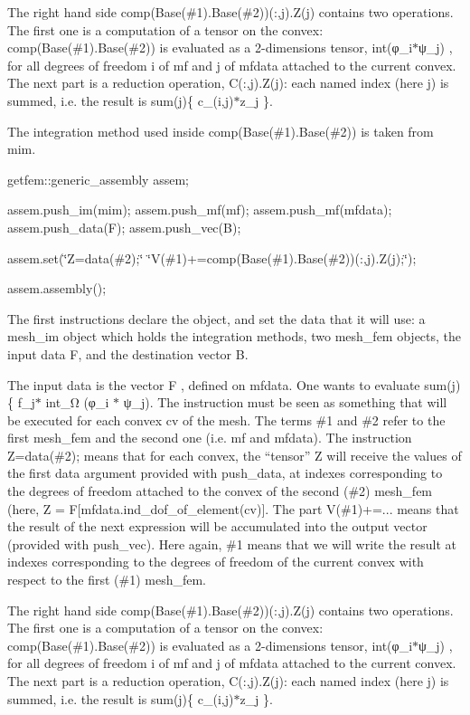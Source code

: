 The right hand side comp(Base(\#1).Base(\#2))(\-:,j).Z(j) contains two operations. The first one is a computation of a tensor on the convex\-: comp(Base(\#1).Base(\#2)) is evaluated as a 2-\/dimensions tensor, int(φ\-\_\-i$\ast$ψ\-\_\-j) , for all degrees of freedom i of mf and j of mfdata attached to the current convex. The next part is a reduction operation, C(\-:,j).Z(j)\-: each named index (here j) is summed, i.\-e. the result is sum(j)\{ c\-\_\-(i,j)$\ast$z\-\_\-j \}.

The integration method used inside comp(Base(\#1).Base(\#2)) is taken from mim.

getfem\-::generic\-\_\-assembly assem;

assem.\-push\-\_\-im(mim); assem.\-push\-\_\-mf(mf); assem.\-push\-\_\-mf(mfdata); assem.\-push\-\_\-data(\-F); assem.\-push\-\_\-vec(\-B);

assem.\-set(\char`\"{}\-Z=data(\#2);\char`\"{} \char`\"{}\-V(\#1)+=comp(\-Base(\#1).\-Base(\#2))(\-:,j).\-Z(j);\char`\"{});

assem.\-assembly();

The first instructions declare the object, and set the data that it will use\-: a mesh\-\_\-im object which holds the integration methods, two mesh\-\_\-fem objects, the input data F, and the destination vector B.

The input data is the vector F , defined on mfdata. One wants to evaluate sum(j)\{ f\-\_\-j$\ast$ int\-\_\-Ω (φ\-\_\-i $\ast$ ψ\-\_\-j). The instruction must be seen as something that will be executed for each convex cv of the mesh. The terms \#1 and \#2 refer to the first mesh\-\_\-fem and the second one (i.\-e. mf and mfdata). The instruction Z=data(\#2); means that for each convex, the “tensor” Z will receive the values of the first data argument provided with push\-\_\-data, at indexes corresponding to the degrees of freedom attached to the convex of the second (\#2) mesh\-\_\-fem (here, Z = F\mbox{[}mfdata.\-ind\-\_\-dof\-\_\-of\-\_\-element(cv)\mbox{]}. The part V(\#1)+=... means that the result of the next expression will be accumulated into the output vector (provided with push\-\_\-vec). Here again, \#1 means that we will write the result at indexes corresponding to the degrees of freedom of the current convex with respect to the first (\#1) mesh\-\_\-fem.

The right hand side comp(Base(\#1).Base(\#2))(\-:,j).Z(j) contains two operations. The first one is a computation of a tensor on the convex\-: comp(Base(\#1).Base(\#2)) is evaluated as a 2-\/dimensions tensor, int(φ\-\_\-i$\ast$ψ\-\_\-j) , for all degrees of freedom i of mf and j of mfdata attached to the current convex. The next part is a reduction operation, C(\-:,j).Z(j)\-: each named index (here j) is summed, i.\-e. the result is sum(j)\{ c\-\_\-(i,j)$\ast$z\-\_\-j \}.

